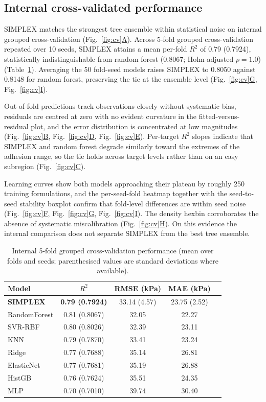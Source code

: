 \documentclass[utf8]{FrontiersinHarvard}
\newcommand{\Fref}[2]{Fig.~\hyperref[#1]{\ref{#1}#2}}
\newcommand{\Tref}[1]{Table~\hyperref[#1]{\ref{#1}}}
\begin{document}
\subsection{Internal cross-validated performance}

SIMPLEX matches the strongest tree ensemble within statistical noise on internal grouped cross-validation (\Fref{fig:cv}{A}). Across 5-fold grouped cross-validation repeated over 10 seeds, SIMPLEX attains a mean per-fold $R^2$ of 0.79 (0.7924), statistically indistinguishable from random forest (0.8067; Holm-adjusted $p = 1.0$) (\Tref{tab:int}). Averaging the 50 fold-seed models raises SIMPLEX to 0.8050 against 0.8148 for random forest, preserving the tie at the ensemble level (\Fref{fig:cv}{G}, \Fref{fig:cv}{I}).

Out-of-fold predictions track observations closely without systematic bias, residuals are centred at zero with no evident curvature in the fitted-versus-residual plot, and the error distribution is concentrated at low magnitudes (\Fref{fig:cv}{B}, \Fref{fig:cv}{D}, \Fref{fig:cv}{E}). Per-target $R^2$ slopes indicate that SIMPLEX and random forest degrade similarly toward the extremes of the adhesion range, so the tie holds across target levels rather than on an easy subregion (\Fref{fig:cv}{C}).

Learning curves show both models approaching their plateau by roughly 250 training formulations, and the per-seed-fold heatmap together with the seed-to-seed stability boxplot confirm that fold-level differences are within seed noise (\Fref{fig:cv}{F}, \Fref{fig:cv}{G}, \Fref{fig:cv}{I}). The density hexbin corroborates the absence of systematic miscalibration (\Fref{fig:cv}{H}). On this evidence the internal comparison does not separate SIMPLEX from the best tree ensemble.

\begin{table}[h]
\centering
\caption{Internal 5-fold grouped cross-validation performance (mean over folds and seeds; parenthesised values are standard deviations where available).}
\label{tab:int}
\begin{tabular}{lcccc}
\toprule
Model & $R^2$ & RMSE (kPa) & MAE (kPa) \\
\midrule
\textbf{SIMPLEX} & \textbf{0.79 (0.7924)} & 33.14 (4.57) & 23.75 (2.52) \\
RandomForest & 0.81 (0.8067) & 32.05 & 22.27 \\
SVR-RBF & 0.80 (0.8026) & 32.39 & 23.11 \\
KNN & 0.79 (0.7870) & 33.41 & 23.24 \\
Ridge & 0.77 (0.7688) & 35.14 & 26.81 \\
ElasticNet & 0.77 (0.7681) & 35.19 & 26.88 \\
HistGB & 0.76 (0.7624) & 35.51 & 24.35 \\
MLP & 0.70 (0.7010) & 39.74 & 30.40 \\
\bottomrule
\end{tabular}
\end{table}
\end{document}

